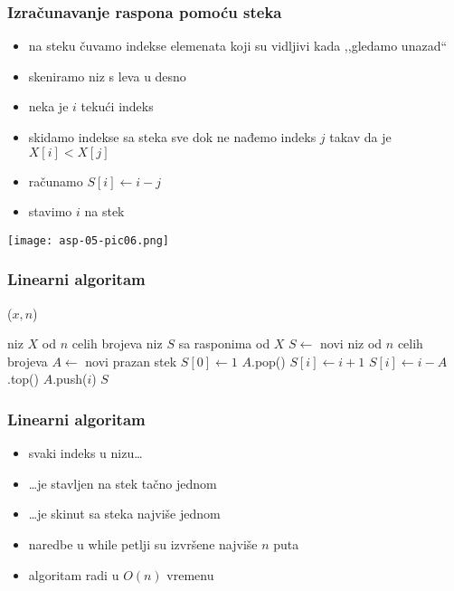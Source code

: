 \documentclass[compress,aspectratio=169]{beamer}
\begin{document}
\begin{frame}[fragile]
  \frametitle{Izračunavanje raspona pomoću steka}
  \begin{itemize}
    \item na steku čuvamo indekse elemenata koji su vidljivi kada ,,gledamo unazad``
    \item skeniramo niz s leva u desno
    \item neka je $i$ tekući indeks
    \item skidamo indekse sa steka sve dok ne nađemo indeks $j$ takav da je $X[i]<X[j]$
    \item računamo $S[i]\leftarrow i-j$
    \item stavimo $i$ na stek
  \end{itemize}
  \begin{center}
    \texttt{[image: asp-05-pic06.png]}
  \end{center}
\end{frame}

\begin{frame}[fragile,shrink=5]
  \frametitle{Linearni algoritam}
($x, n$)
\begin{algorithmic}
\REQUIRE niz $X$ od $n$ celih brojeva
\ENSURE niz $S$ sa rasponima od $X$
\STATE $S \leftarrow$ novi niz od $n$ celih brojeva
\STATE $A \leftarrow$ novi prazan stek
\STATE $S[0]\leftarrow 1$
    \STATE $A$.pop()
  \ENDWHILE
    \STATE $S[i]\leftarrow i+1$
  \ELSE
    \STATE $S[i]\leftarrow i-A$.top()
  \ENDIF
  \STATE $A$.push($i$)  
\ENDFOR
\RETURN $S$
\end{algorithmic}
\end{frame}

\begin{frame}[fragile]
  \frametitle{Linearni algoritam}
  \begin{itemize}
    \item svaki indeks u nizu\ldots
    \item \ldots je stavljen na stek tačno jednom
    \item \ldots je skinut sa steka najviše jednom
    \item naredbe u while petlji su izvršene najviše $n$ puta
    \item algoritam radi u $O(n)$ vremenu
  \end{itemize}
\end{frame}
\end{document}
